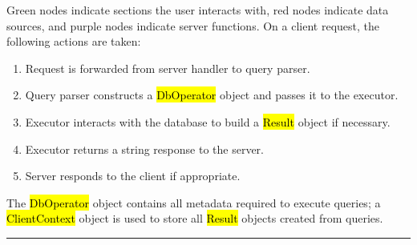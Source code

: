 \documentclass[paper=letter, fontsize=11pt]{scrartcl}
\numberwithin{equation}{section}
\numberwithin{figure}{section}
\numberwithin{table}{section}
\newcommand{\horrule}[1]{\rule{\linewidth}{#1}}
\renewcommand{\texttt}[1]{\hl{\ttfamily #1}}
\begin{document}
\begin{center}
\end{center}

Green nodes indicate sections the user interacts with, red nodes indicate data sources, and purple nodes indicate server functions.  On a client request, the following actions are taken:
\begin{enumerate}
	\item Request is forwarded from server handler to query parser.
	\item Query parser constructs a \texttt{DbOperator} object and passes it to the executor.
	\item Executor interacts with the database to build a \texttt{Result} object if necessary.
	\item Executor returns a string response to the server.
	\item Server responds to the client if appropriate.
\end{enumerate}

The \texttt{DbOperator} object contains all metadata required to execute queries; a \texttt{ClientContext} object is used to store all \texttt{Result} objects created from queries.

\horrule{0.5pt} 
\end{document}

